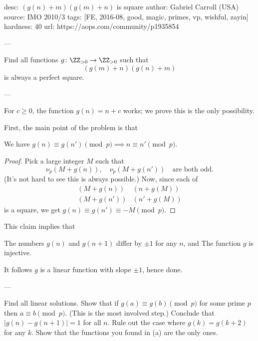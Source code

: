 desc: $(g(n)+m)(g(m)+n)$ is square
author: Gabriel Carroll (USA)
source: IMO 2010/3
tags: [FE, 2016-08, good, magic, primes, vp, wishful, zayin]
hardness: 40
url: https://aops.com/community/p1935854

---

Find all functions $g \colon \ZZ_{>0} \to \ZZ_{>0}$ such that
\[ \left( g(m)+n \right)\left( g(n)+m \right) \]
is always a perfect square.

---

For $c \ge 0$, the function $g(n) = n+c$ works;
we prove this is the only possibility.

First, the main point of the problem is that
\begin{claim*}
  We have
  $g(n) \equiv g(n') \pmod p \implies n \equiv n' \pmod p$.
\end{claim*}
\begin{proof}
  Pick a large integer $M$ such that
  \[ \nu_p(M+g(n)), \quad \nu_p(M+g(n')) \quad
    \text{are both odd}. \]
  (It's not hard to see this is always possible.)
  Now, since each of
  \begin{align*}
    \left( M + g(n) \right)&\left( n + g(M)  \right) \\
    \left( M + g(n') \right)&\left( n' + g(M)  \right)
  \end{align*}
  is a square, we get $g(n) \equiv g(n') \equiv -M \pmod p$.
\end{proof}

This claim implies that
\begin{itemize}
  \ii The numbers $g(n)$ and $g(n+1)$ differ by $\pm 1$ for any $n$, and
  \ii The function $g$ is injective.
\end{itemize}
It follows $g$ is a linear function with slope $\pm 1$, hence done.

---

\begin{walk}
  \ii Find all linear solutions.
  \ii Show that if $g(a) \equiv g(b) \pmod p$
  for some prime $p$ then $a \equiv b \pmod p$.
  (This is the most involved step.)
  \ii Conclude that $|g(n)-g(n+1)| = 1$ for all $n$.
  \ii Rule out the case where $g(k) = g(k+2)$ for any $k$.
  \ii Show that the functions you found in (a)
  are the only ones.
\end{walk}
